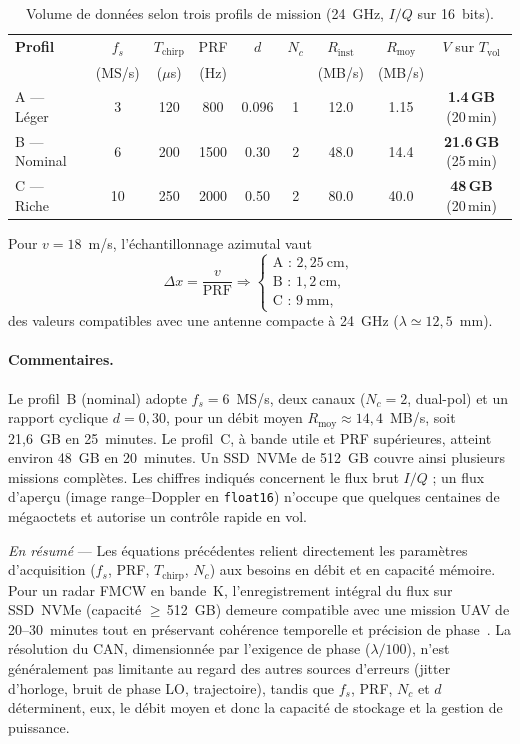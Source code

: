 \begin{table}[H]
\centering
\label{tab:volume_donnees_vol_24ghz}
\renewcommand{\arraystretch}{1.1}
\begin{tabular}{@{}lcccccccc@{}}
\toprule
\textbf{Profil} & $f_s$ & $T_{\mathrm{chirp}}$ & PRF & $d$ & $N_c$ & $R_{\mathrm{inst}}$ & $R_{\mathrm{moy}}$ & $V$ sur $T_{\mathrm{vol}}$ \\
 & (MS/s) & ($\mu$s) & (Hz) &  &  & (MB/s) & (MB/s) &  \\ \midrule
A — Léger   & 3  & 120 & 800  & 0.096 & 1 & 12.0 & 1.15 & \textbf{1.4\,GB} (20\,min) \\
B — Nominal & 6  & 200 & 1500 & 0.30  & 2 & 48.0 & 14.4 & \textbf{21.6\,GB} (25\,min) \\
C — Riche   & 10 & 250 & 2000 & 0.50  & 2 & 80.0 & 40.0 & \textbf{48\,GB}  (20\,min) \\
\bottomrule
\end{tabular}
\caption{Volume de données selon trois profils de mission (24~GHz, $I/Q$ sur 16~bits).}
\end{table}

\noindent Pour $v=18$~m/s, l’échantillonnage azimutal vaut
\[
\Delta x = \frac{v}{\mathrm{PRF}} \Rightarrow
\begin{cases}
\text{A : } 2{,}25~\mathrm{cm},\\
\text{B : } 1{,}2~\mathrm{cm},\\
\text{C : } 9~\mathrm{mm},
\end{cases}
\]
des valeurs compatibles avec une antenne compacte à 24~GHz ($\lambda\simeq12{,}5$~mm).

\paragraph{Commentaires.}
Le profil~B (nominal) adopte $f_s=6$~MS/s, deux canaux ($N_c=2$, dual-pol) et un rapport cyclique $d=0{,}30$, pour un débit moyen $R_{\mathrm{moy}}\approx 14{,}4$~MB/s, soit 21{,}6~GB en 25~minutes. Le profil~C, à bande utile et PRF supérieures, atteint environ 48~GB en 20~minutes. Un SSD~NVMe de 512~GB couvre ainsi plusieurs missions complètes. Les chiffres indiqués concernent le flux brut $I/Q$ ; un flux d’aperçu (image range–Doppler en \texttt{float16}) n’occupe que quelques centaines de mégaoctets et autorise un contrôle rapide en vol.

\medskip
\noindent\textit{En résumé} — Les équations précédentes relient directement les paramètres d’acquisition ($f_s$, PRF, $T_{\mathrm{chirp}}$, $N_c$) aux besoins en débit et en capacité mémoire. Pour un radar FMCW en bande~K, l’enregistrement intégral du flux sur SSD~NVMe (capacité $\geq$\,512~GB) demeure compatible avec une mission UAV de 20–30~minutes tout en préservant cohérence temporelle et précision de phase~\cite{Aguasca2013_ARBRES_UAV_SAR,cumming2005,richards2010}. La résolution du CAN, dimensionnée par l’exigence de phase ($\lambda/100$), n’est généralement pas limitante au regard des autres sources d’erreurs (jitter d’horloge, bruit de phase LO, trajectoire), tandis que $f_s$, PRF, $N_c$ et $d$ déterminent, eux, le débit moyen et donc la capacité de stockage et la gestion de puissance.


